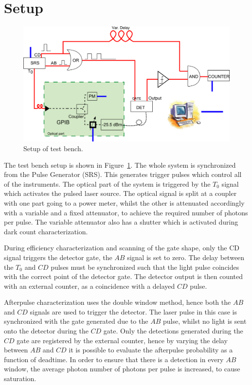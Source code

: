 \documentclass{article}
\begin{document}
\section{Setup}

\begin{figure}
\centering
\includegraphics[width=12cm]{images/SetupGated2.png}
\caption{Setup of test bench.}
\label{setup}
\end{figure}
The test bench setup is shown in Figure~\ref{setup}. The whole system is synchronized from the Pulse Generator (SRS). This generates trigger pulses which control all of the instruments. The optical part of the system is triggered by the $T_{0}$ signal which activates the pulsed laser source. The optical signal is split at a coupler with one part going to a power meter, whilst the other is attenuated accordingly with a variable and a fixed attenuator, to achieve the required number of photons per pulse. The variable attenuator also has a shutter which is activated during dark count characterization.

During efficiency characterization and scanning of the gate shape, only the CD signal triggers the detector gate, the $AB$ signal is set to zero. The delay between the $T_0$ and $CD$ pulses must be synchronized such that the light pulse coincides with the correct point of the detector gate. The detector output is then counted with an external counter, as a coincidence with a delayed $CD$ pulse. 

Afterpulse characterization uses the double window method, hence both the $AB$ and $CD$ signals are used to trigger the detector. The laser pulse in this case is synchronized with the gate generated due to the $AB$ pulse, whilst no light is sent onto the detector during the $CD$ gate. Only the detections generated during the $CD$ gate are registered by the external counter, hence by varying the delay between $AB$ and $CD$ it is possible to evaluate the afterpulse probability as a function of deadtime. In order to ensure that there is a detection in every $AB$ window, the average photon number of photons per pulse is increased, to cause saturation.  
\end{document}
